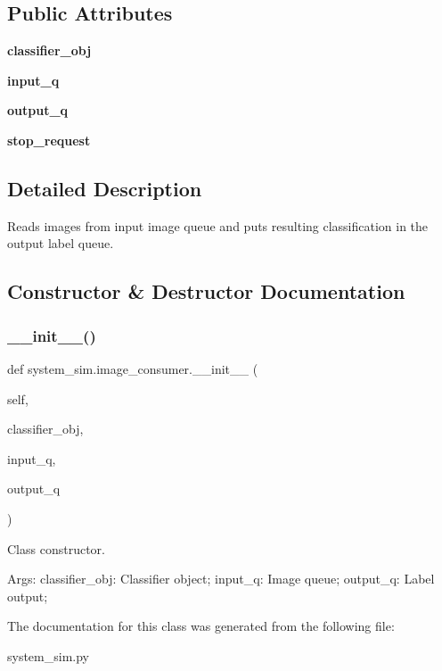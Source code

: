 \subsection*{Public Attributes}
\begin{DoxyCompactItemize}
\item 
\mbox{\label{classsystem__sim_1_1image__consumer_a26b16a737ce98eae14d50a222591e147}} 
{\bfseries classifier\+\_\+obj}
\item 
\mbox{\label{classsystem__sim_1_1image__consumer_a11b3d55a09bf458609f2b015d9e48ae4}} 
{\bfseries input\+\_\+q}
\item 
\mbox{\label{classsystem__sim_1_1image__consumer_ab093177d3463d22db2238400c8f3bdad}} 
{\bfseries output\+\_\+q}
\item 
\mbox{\label{classsystem__sim_1_1image__consumer_a353677860da29659f07c091340e23c19}} 
{\bfseries stop\+\_\+request}
\end{DoxyCompactItemize}


\subsection{Detailed Description}
Reads images from input image queue and puts resulting classification in the output label queue. 

\subsection{Constructor \& Destructor Documentation}
\mbox{\label{classsystem__sim_1_1image__consumer_a525e8c9e9b3f00bb4fd4ad66389bebc4}} 
\subsubsection{\texorpdfstring{\+\_\+\+\_\+init\+\_\+\+\_\+()}{\_\_init\_\_()}}
{\footnotesize\ttfamily def system\+\_\+sim.\+image\+\_\+consumer.\+\_\+\+\_\+init\+\_\+\+\_\+ (\begin{DoxyParamCaption}\item[{}]{self,  }\item[{}]{classifier\+\_\+obj,  }\item[{}]{input\+\_\+q,  }\item[{}]{output\+\_\+q }\end{DoxyParamCaption})}



Class constructor. 

Args\+: classifier\+\_\+obj\+: Classifier object; input\+\_\+q\+: Image queue; output\+\_\+q\+: Label output; 

The documentation for this class was generated from the following file\+:\begin{DoxyCompactItemize}
\item 
system\+\_\+sim.\+py\end{DoxyCompactItemize}
